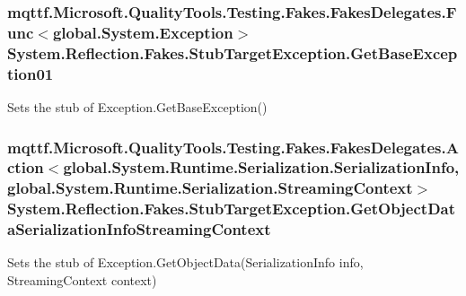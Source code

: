 \hypertarget{class_system_1_1_reflection_1_1_fakes_1_1_stub_target_exception_a47416aea142b9cf26b90dfa2af6f00db}{
\subsubsection[{Get\-Base\-Exception01}]{\setlength{\rightskip}{0pt plus 5cm}mqttf.\-Microsoft.\-Quality\-Tools.\-Testing.\-Fakes.\-Fakes\-Delegates.\-Func$<$global.\-System.\-Exception$>$ System.\-Reflection.\-Fakes.\-Stub\-Target\-Exception.\-Get\-Base\-Exception01}}\label{class_system_1_1_reflection_1_1_fakes_1_1_stub_target_exception_a47416aea142b9cf26b90dfa2af6f00db}


Sets the stub of Exception.\-Get\-Base\-Exception()

\hypertarget{class_system_1_1_reflection_1_1_fakes_1_1_stub_target_exception_af92e36acba499bdb6e7d8c678a8f3574}{
\subsubsection[{Get\-Object\-Data\-Serialization\-Info\-Streaming\-Context}]{\setlength{\rightskip}{0pt plus 5cm}mqttf.\-Microsoft.\-Quality\-Tools.\-Testing.\-Fakes.\-Fakes\-Delegates.\-Action$<$global.\-System.\-Runtime.\-Serialization.\-Serialization\-Info, global.\-System.\-Runtime.\-Serialization.\-Streaming\-Context$>$ System.\-Reflection.\-Fakes.\-Stub\-Target\-Exception.\-Get\-Object\-Data\-Serialization\-Info\-Streaming\-Context}}\label{class_system_1_1_reflection_1_1_fakes_1_1_stub_target_exception_af92e36acba499bdb6e7d8c678a8f3574}


Sets the stub of Exception.\-Get\-Object\-Data(\-Serialization\-Info info, Streaming\-Context context)

